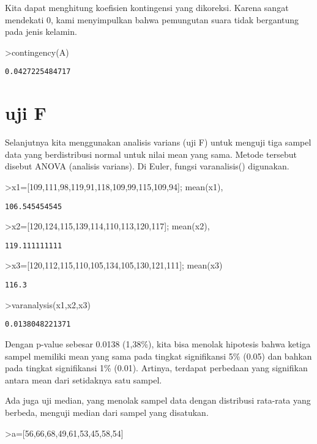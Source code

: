 \documentclass[
]{book}
\begin{document}
Kita dapat menghitung koefisien kontingensi yang dikoreksi. Karena sangat mendekati 0, kami menyimpulkan bahwa pemungutan suara tidak bergantung pada jenis kelamin.

\textgreater contingency(A)

\begin{verbatim}
0.0427225484717
\end{verbatim}

\chapter{uji F}\label{uji-f}

Selanjutnya kita menggunakan analisis varians (uji F) untuk menguji tiga sampel data yang berdistribusi normal untuk nilai mean yang sama. Metode tersebut disebut ANOVA (analisis varians). Di Euler, fungsi varanalisis() digunakan.

\textgreater x1={[}109,111,98,119,91,118,109,99,115,109,94{]}; mean(x1),

\begin{verbatim}
106.545454545
\end{verbatim}

\textgreater x2={[}120,124,115,139,114,110,113,120,117{]}; mean(x2),

\begin{verbatim}
119.111111111
\end{verbatim}

\textgreater x3={[}120,112,115,110,105,134,105,130,121,111{]}; mean(x3)

\begin{verbatim}
116.3
\end{verbatim}

\textgreater varanalysis(x1,x2,x3)

\begin{verbatim}
0.0138048221371
\end{verbatim}

Dengan p-value sebesar 0.0138 (1,38\%), kita bisa menolak hipotesis bahwa ketiga sampel memiliki mean yang sama pada tingkat signifikansi 5\% (0.05) dan bahkan pada tingkat signifikansi 1\% (0.01). Artinya, terdapat perbedaan yang signifikan antara mean dari setidaknya satu sampel.

Ada juga uji median, yang menolak sampel data dengan distribusi rata-rata yang berbeda, menguji median dari sampel yang disatukan.

\textgreater a={[}56,66,68,49,61,53,45,58,54{]}
\end{document}
